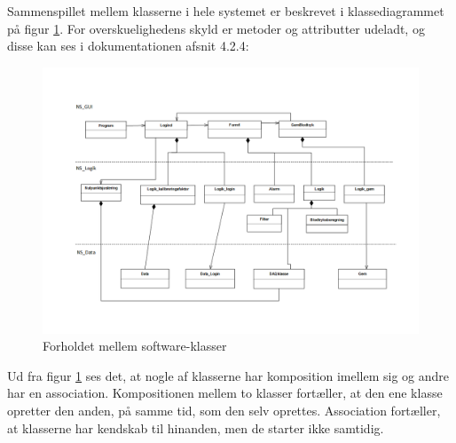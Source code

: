 Sammenspillet mellem klasserne i hele systemet er beskrevet i klassediagrammet på figur \ref{komposition}. For overskuelighedens skyld er metoder og attributter udeladt, og disse kan ses i dokumentationen afsnit 4.2.4:
\begin{figure}[H]
	\includegraphics[width=1\textwidth]{Figurer/Softwareimplementering/komposition}
	\caption{Forholdet mellem software-klasser}
	\label{komposition}
\end{figure}
Ud fra figur \ref{komposition} ses det, at nogle af klasserne har komposition imellem sig og andre har en association. Kompositionen mellem to klasser fortæller, at den ene klasse opretter den anden, på samme tid, som den selv oprettes. Association fortæller, at klasserne har kendskab til hinanden, men de starter ikke samtidig. 



